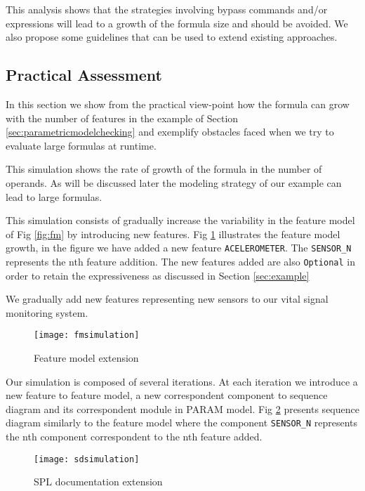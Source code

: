 \documentclass[conference]{IEEEtran}
\begin{document}
	This analysis shows that the strategies
	involving bypass commands and/or expressions will lead
	to a growth of the formula size and should be avoided.
	We also propose some guidelines that can be used to extend existing approaches.
	

	\subsection{Practical Assessment}
	
	In this section we show from the practical view-point how the formula
	can grow with the number of features in the example of Section \ref{sec:parametricmodelchecking}  and exemplify obstacles faced
	when we try to evaluate large formulas at runtime.

	This simulation shows the rate of 
	growth of the formula in the number of operands. As will be discussed later
	the modeling strategy of our example can lead to large formulas.
	
	This simulation consists of gradually increase the variability in the feature model
	of Fig \ref{fig:fm} by introducing new features. Fig \ref{fig:fmsimulation}
	illustrates the feature model growth, in the figure we have added a new feature \texttt{ACELEROMETER}.
	The \texttt{SENSOR\_N} represents the nth feature addition. The new features added
	are also \texttt{Optional} in order to retain the expressiveness as discussed in Section \ref{sec:example}
	
	
	
	We gradually add new features representing new sensors to our vital signal monitoring system. 
	
	\begin{figure}[!h]
	\centering
	\texttt{[image: fmsimulation]}	
	\caption{Feature model extension}
	\label{fig:fmsimulation}
	\end{figure}
	
	Our simulation is composed of several iterations. At each iteration we
	introduce a new feature to feature model, a new correspondent component 
	to sequence diagram and its 
	correspondent module in PARAM model. Fig \ref{fig:sdsimulation}
	presents sequence diagram similarly to the feature model where the component
	\texttt{SENSOR\_N} represents the nth component correspondent to the
	nth feature added.
	
	\begin{figure}[!h]
	\centering
	\texttt{[image: sdsimulation]}	
	\caption{SPL documentation extension}
	\label{fig:sdsimulation}
	\end{figure}
	
\end{document}
